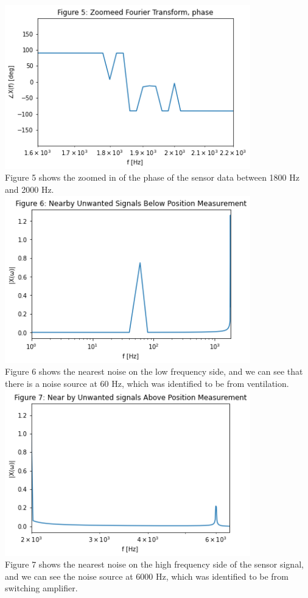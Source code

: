 \documentclass[12pt,a4paper]{article}
\begin{document}
\includegraphics[width=0.8\textwidth]{Figure 5.png}\\
Figure 5 shows the zoomed in of the phase of the sensor data between 1800 Hz and 2000 Hz.\\


\includegraphics[width=0.8\textwidth]{Figure 6.png}\\
Figure 6 shows the nearest noise on the low frequency side, and we can see that there is a noise source at 60 Hz, which was identified to be from ventilation.\\


\includegraphics[width=0.8\textwidth]{Figure 7.png}\\
Figure 7 shows the nearest noise on the high frequency side of the sensor signal, and we can see the noise source at 6000 Hz, which was identified to be from switching amplifier.\\
\end{document}
